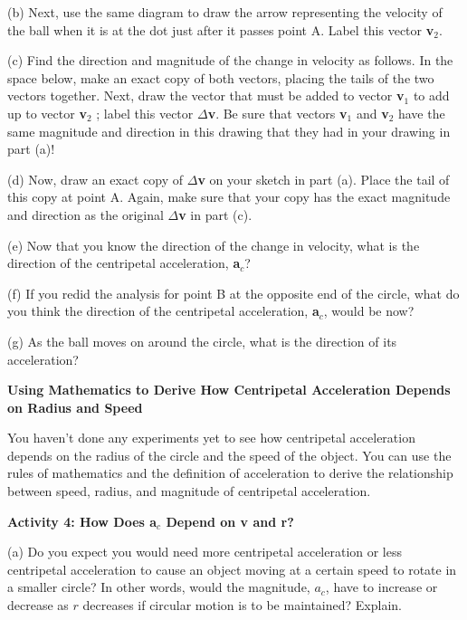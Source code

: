 (b) Next, use the same diagram to draw the arrow representing the velocity of
the ball when it is at the dot just after it passes point A. Label this vector
\textbf{v}\( _{2} \).

(c) Find the direction and magnitude of the change in velocity as follows. In
the space below, make an exact copy of both vectors, placing the tails of the
two vectors together. Next, draw the vector that must be added to vector \textbf{v}\( _{1} \)
to add up to vector \textbf{v}\( _{2} \) ; label this vector \( \Delta  \)\textbf{v}.
Be sure that vectors \textbf{v}\( _{1} \) and \textbf{v}\( _{2} \) have the
same magnitude and direction in this drawing that they had in your drawing in
part (a)!
\vspace{30mm}

(d) Now, draw an exact copy of \( \Delta  \)\textbf{v} on your sketch in part
(a). Place the tail of this copy at point A. Again, make sure that your copy
has the exact magnitude and direction as the original \( \Delta  \)\textbf{v}
in part (c).
\vspace{30mm}

(e) Now that you know the direction of the change in velocity, what is the direction
of the centripetal acceleration, \textbf{a}\( _{c} \)?
\vspace{20mm}

(f) If you redid the analysis for point B at the opposite end of the circle,
what do you think the direction of the centripetal acceleration, \textbf{a}\( _{c} \),
would be now?
\vspace{20mm}

(g) As the ball moves on around the circle, what is the direction of its acceleration?
\vspace{20mm}

\textbf{Using Mathematics to Derive How Centripetal Acceleration Depends on
Radius and Speed }

You haven't done any experiments yet to see how centripetal acceleration depends
on the radius of the circle and the speed of the object. You can use the rules
of mathematics and the definition of acceleration to derive the relationship
between speed, radius, and magnitude of centripetal acceleration. 

\textbf{Activity 4: How Does a\( _{c} \) Depend on v and r?} 

(a) Do you expect you would need more centripetal acceleration or less centripetal
acceleration to cause an object moving at a certain speed to rotate in a smaller
circle? In other words, would the magnitude, \( a_{c} \), have to increase
or decrease as $r$ decreases if circular motion is to be maintained? Explain.
\vspace{20mm}

